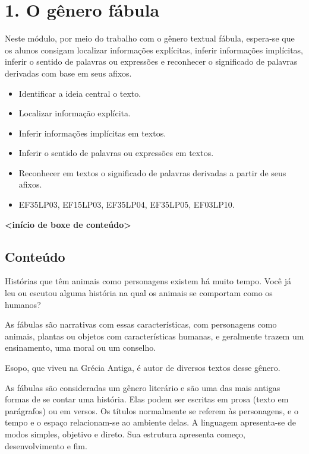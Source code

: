 \section{1. O gênero fábula}\label{muxf3dulo-1}

\protect\hypertarget{_Hlk127342659}{}{}Neste módulo, por meio do
trabalho com o gênero textual fábula, espera-se que os alunos consigam
localizar informações explícitas, inferir informações implícitas,
inferir o sentido de palavras ou expressões e reconhecer o significado
de palavras derivadas com base em seus afixos.
\protect\hypertarget{_Hlk127342929}{}{}


\begin{itemize}
  \item Identificar a ideia central o texto.
  \item Localizar informação explícita.
  \item Inferir informações implícitas em textos.
  \item Inferir o sentido de palavras ou expressões em textos.
  \item Reconhecer em textos o significado de palavras derivadas a partir de
seus afixos.
\end{itemize}


\begin{itemize}
  \item EF35LP03, EF15LP03, EF35LP04, EF35LP05, EF03LP10.
\end{itemize}

\textbf{\textless{}início de boxe de conteúdo\textgreater{}}

\subsection{Conteúdo}\label{conteuxfado}

Histórias que têm animais como personagens existem há muito tempo. Você
já leu ou escutou alguma história na qual os animais se comportam como
os humanos?

As fábulas são narrativas com essas características, com personagens
como animais, plantas ou objetos com características humanas, e
geralmente trazem um ensinamento, uma moral ou um conselho.

Esopo, que viveu na Grécia Antiga, é autor de diversos textos desse
gênero.

As fábulas são consideradas um gênero literário e são uma das mais
antigas formas de se contar uma história. Elas podem ser escritas
em prosa (texto em parágrafos) ou em versos. Os títulos normalmente se
referem às personagens, e o tempo e o espaço relacionam-se ao ambiente
delas. A linguagem apresenta-se de modos simples, objetivo e direto. Sua
estrutura apresenta começo, desenvolvimento e fim.

